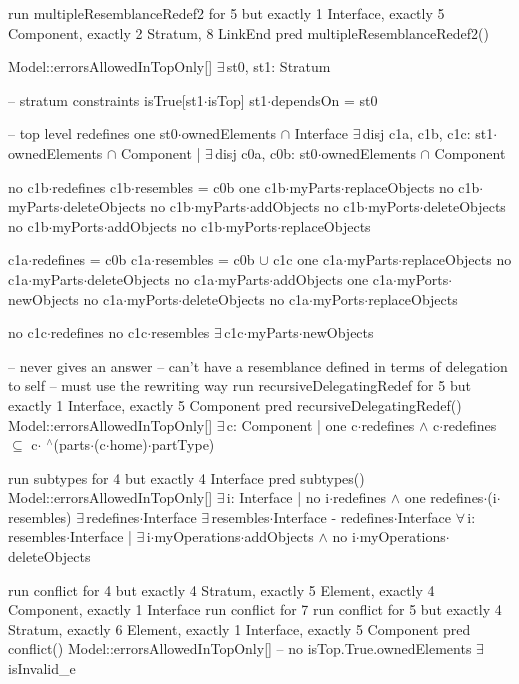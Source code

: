 run multipleResemblanceRedef2 for 5 but exactly 1 Interface, exactly 5 Component, exactly 2 Stratum, 8 LinkEnd
pred multipleResemblanceRedef2()
{
  Model::errorsAllowedInTopOnly[]
  $\exists\,$st0, st1: Stratum
  {
    -- stratum constraints
    isTrue[st1$\cdot$isTop]
    st1$\cdot$dependsOn = st0

    -- top level redefines
    one st0$\cdot$ownedElements $\cap$ Interface
    $\exists\,$disj c1a, c1b, c1c: st1$\cdot$ownedElements $\cap$ Component |
    $\exists\,$disj c0a, c0b: st0$\cdot$ownedElements $\cap$ Component
    {
      no c1b$\cdot$redefines
      c1b$\cdot$resembles = c0b
      one c1b$\cdot$myParts$\cdot$replaceObjects
      no c1b$\cdot$myParts$\cdot$deleteObjects
      no c1b$\cdot$myParts$\cdot$addObjects
      no c1b$\cdot$myPorts$\cdot$deleteObjects
      no c1b$\cdot$myPorts$\cdot$addObjects
      no c1b$\cdot$myPorts$\cdot$replaceObjects
      
      c1a$\cdot$redefines = c0b
      c1a$\cdot$resembles = c0b $\cup$ c1c
      one c1a$\cdot$myParts$\cdot$replaceObjects
      no c1a$\cdot$myParts$\cdot$deleteObjects
      no c1a$\cdot$myParts$\cdot$addObjects
      one c1a$\cdot$myPorts$\cdot$newObjects
      no c1a$\cdot$myPorts$\cdot$deleteObjects
      no c1a$\cdot$myPorts$\cdot$replaceObjects

      no c1c$\cdot$redefines
      no c1c$\cdot$resembles
      $\exists\,$c1c$\cdot$myParts$\cdot$newObjects
    }
  }
}

-- never gives an answer -- can't have a resemblance defined in terms of delegation to self
-- must use the rewriting way
run recursiveDelegatingRedef for 5 but exactly 1 Interface, exactly 5 Component
pred recursiveDelegatingRedef()
{
  Model::errorsAllowedInTopOnly[]
  $\exists\,$c: Component |
    one c$\cdot$redefines $\wedge$ c$\cdot$redefines $\subseteq$ c$\cdot$ $\!\!\!^\wedge\!$(parts$\cdot$(c$\cdot$home)$\cdot$partType)
}

run subtypes for 4 but exactly 4 Interface
pred subtypes()
{
  Model::errorsAllowedInTopOnly[]
  $\exists\,$i: Interface |
    no i$\cdot$redefines $\wedge$ one redefines$\cdot$(i$\cdot$resembles)
  $\exists\,$redefines$\cdot$Interface
  $\exists\,$resembles$\cdot$Interface - redefines$\cdot$Interface
  $\forall\,$i: resembles$\cdot$Interface | $\exists\,$i$\cdot$myOperations$\cdot$addObjects $\wedge$ no i$\cdot$myOperations$\cdot$deleteObjects
}


run conflict for 4 but exactly 4 Stratum, exactly 5 Element, exactly 4 Component, exactly 1 Interface
run conflict for 7
run conflict for 5 but exactly 4 Stratum, exactly 6 Element, exactly 1 Interface, exactly 5 Component
pred conflict()
{
  Model::errorsAllowedInTopOnly[]
--  no isTop.True.ownedElements
  $\exists\,$isInvalid_e
}

